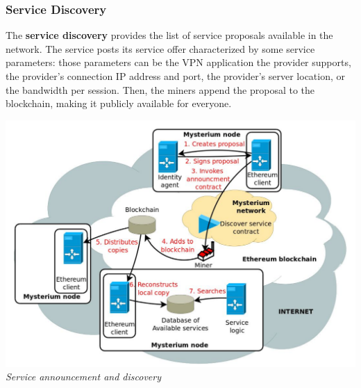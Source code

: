 \documentclass[12pt]{article}
\begin{document}
	\subsubsection{Service Discovery}
	The \textbf{service discovery} provides the list of service proposals available in the network. The service posts its service offer characterized by some service parameters: those parameters can be the VPN application the provider supports, the provider's connection IP address and port, the provider's server location, or the bandwidth per session. Then, the miners append the proposal to the blockchain, making it publicly available for everyone.\\

	\bigbreak
	\begin{center}
		\includegraphics[width=1\linewidth]{images/mysterium_service_announcement.png}
		\small{\textit{Service announcement and discovery}}
	\end{center}
	
\end{document}
